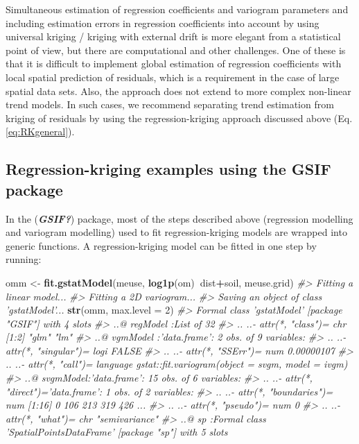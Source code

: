 \documentclass[11pt]{krantz}
\newenvironment{Shaded}{\begin{snugshade}}{\end{snugshade}}
\newcommand{\CommentTok}[1]{\textcolor[rgb]{0.37,0.37,0.37}{\textit{#1}}}
\newcommand{\DataTypeTok}[1]{\textcolor[rgb]{0.27,0.27,0.27}{#1}}
\newcommand{\DecValTok}[1]{\textcolor[rgb]{0.06,0.06,0.06}{#1}}
\newcommand{\KeywordTok}[1]{\textcolor[rgb]{0.27,0.27,0.27}{\textbf{#1}}}
\newcommand{\NormalTok}[1]{#1}
\newcommand{\OperatorTok}[1]{\textcolor[rgb]{0.43,0.43,0.43}{\textbf{#1}}}
\newcommand{\StringTok}[1]{\textcolor[rgb]{0.5,0.5,0.5}{#1}}
\theoremstyle{definition}
\theoremstyle{definition}
\theoremstyle{definition}
\theoremstyle{remark}
\begin{document}
Simultaneous estimation of regression coefficients and variogram
parameters and including estimation errors in regression coefficients
into account by using universal kriging / kriging with external drift is
more elegant from a statistical point of view, but there are
computational and other challenges. One of these is that it is difficult
to implement global estimation of regression coefficients with local
spatial prediction of residuals, which is a requirement in the case of
large spatial data sets. Also, the approach does not extend to more
complex non-linear trend models. In such cases, we recommend separating
trend estimation from kriging of residuals by using the
regression-kriging approach discussed above (Eq.\eqref{eq:RKgeneral}).

\hypertarget{regression-kriging-examples-using-the-gsif-package}{%
\subsection{Regression-kriging examples using the GSIF
package}\label{regression-kriging-examples-using-the-gsif-package}}

In the (\textbf{\emph{GSIF?}}) package, most of the steps described
above (regression modelling and variogram modelling) used to fit
regression-kriging models are wrapped into generic functions. A
regression-kriging model can be fitted in one step by running:

\begin{Shaded}
\begin{Highlighting}[]
\NormalTok{omm <-}\StringTok{ }\KeywordTok{fit.gstatModel}\NormalTok{(meuse, }\KeywordTok{log1p}\NormalTok{(om)}\OperatorTok{~}\NormalTok{dist}\OperatorTok{+}\NormalTok{soil, meuse.grid)}
\CommentTok{#> Fitting a linear model...}
\CommentTok{#> Fitting a 2D variogram...}
\CommentTok{#> Saving an object of class 'gstatModel'...}
\KeywordTok{str}\NormalTok{(omm, }\DataTypeTok{max.level =} \DecValTok{2}\NormalTok{)}
\CommentTok{#> Formal class 'gstatModel' [package "GSIF"] with 4 slots}
\CommentTok{#>   ..@ regModel :List of 32}
\CommentTok{#>   .. ..- attr(*, "class")= chr [1:2] "glm" "lm"}
\CommentTok{#>   ..@ vgmModel :'data.frame':    2 obs. of  9 variables:}
\CommentTok{#>   .. ..- attr(*, "singular")= logi FALSE}
\CommentTok{#>   .. ..- attr(*, "SSErr")= num 0.00000107}
\CommentTok{#>   .. ..- attr(*, "call")= language gstat::fit.variogram(object = svgm, model = ivgm)}
\CommentTok{#>   ..@ svgmModel:'data.frame':    15 obs. of  6 variables:}
\CommentTok{#>   .. ..- attr(*, "direct")='data.frame': 1 obs. of  2 variables:}
\CommentTok{#>   .. ..- attr(*, "boundaries")= num [1:16] 0 106 213 319 426 ...}
\CommentTok{#>   .. ..- attr(*, "pseudo")= num 0}
\CommentTok{#>   .. ..- attr(*, "what")= chr "semivariance"}
\CommentTok{#>   ..@ sp       :Formal class 'SpatialPointsDataFrame' [package "sp"] with 5 slots}
\end{Highlighting}
\end{Shaded}
\end{document}
